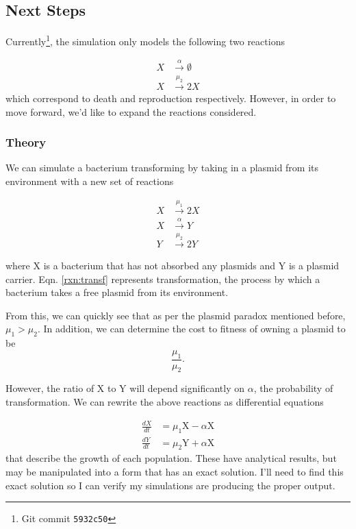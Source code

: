\documentclass[oneside]{labbook}
\newcommand{\commit}[1]{\footnote{Git commit \texttt{#1}}}
\newcommand{\reaction}[4][]{
  \begin{equation}
  #2 \overset{#4}{\rightarrow} #3
  \end{equation}}
\newcommand{\lreaction}[4]{
  \begin{equation}
  #2 \overset{#4}{\rightarrow} #3
  \end{equation}}
\begin{document}
\subsection*{Next Steps}

Currently\commit{5932c50}, the simulation only models the following two reactions

\begin{align}
  X & \overset{\alpha}{\rightarrow} \emptyset\\
  X & \overset{\mu_2}{\rightarrow} 2X
\end{align}
which correspond to death and reproduction respectively. However, in order to
move forward, we'd like to expand the reactions considered.

\subsubsection{Theory}

We can simulate a bacterium transforming by taking in a plasmid from its
environment with a new set of reactions


\begin{align}
  X & \overset{\mu_1}{\rightarrow} 2X \label{rxn:x_birth}\\
  X & \overset{\alpha}{\rightarrow} Y \label{rxn:transf}\\
  Y & \overset{\mu_2}{\rightarrow} 2Y \label{rxn:y_birth}
\end{align}

where X is a bacterium that has not absorbed any plasmids and Y is a plasmid
carrier. Eqn. \ref{rxn:transf} represents transformation, the
process by which a bacterium takes a free plasmid from its environment.

From this, we can quickly see that as per the plasmid paradox mentioned before,
$\mu_1 > \mu_2$. In addition, we can determine the cost to fitness of owning a
plasmid to be
\begin{equation}
\frac{\mu_1}{\mu_2}.
\end{equation}

However, the ratio of X to Y will depend significantly on $\alpha$, the probability
of transformation. We can rewrite the above reactions as differential equations

\begin{align}
  \frac{dX}{dt} & = \mu_1 \text{X} - \alpha \text{X} \label{eq:x_pop}\\
  \frac{dY}{dt} & = \mu_2 \text{Y} + \alpha \text{X} \label{eq:y_pop}
\end{align}
that describe the growth of each population. These have analytical results, but
may be manipulated into a form that has an exact solution. I'll need to find this
exact solution so I can verify my simulations are producing the proper output.
\end{document}
